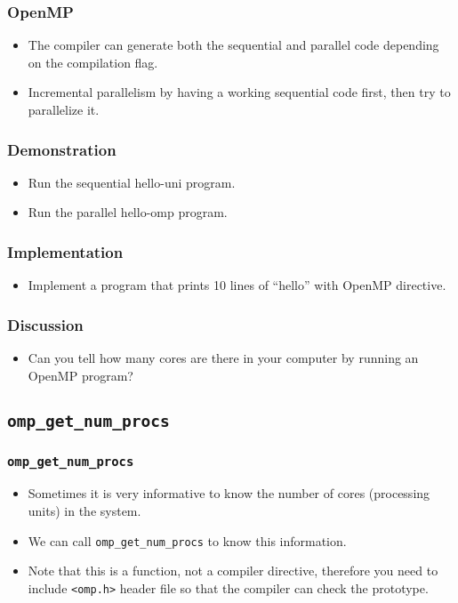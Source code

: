 \documentclass{beamer}
\begin{document}
\begin{frame}
\frametitle{OpenMP} 
\begin{itemize}
\item The compiler can generate both the sequential and parallel
  code depending on the compilation flag.
\item Incremental parallelism by having a working sequential code
  first, then try to parallelize it.
\end{itemize}
\end{frame}

\begin{frame}
\frametitle{Demonstration}
\begin{itemize}
\item Run the sequential hello-uni program.
\item Run the parallel hello-omp program.
\end{itemize}
\end{frame}

\begin{frame}
\frametitle{Implementation}
\begin{itemize}
\item Implement a program that prints 10 lines of ``hello'' with
  OpenMP directive.
\end{itemize}
\end{frame}

\begin{frame}
\frametitle{Discussion}
\begin{itemize}
\item Can you tell how many cores are there in your computer by running
  an OpenMP program?
\end{itemize}
\end{frame}

\subsection{\tt omp\_get\_num\_procs}

\begin{frame}
\frametitle{\tt omp\_get\_num\_procs}
\begin{itemize}
\item Sometimes it is very informative to know the number of cores
  (processing units) in the system.
\item We can call {\tt omp\_get\_num\_procs} to know this information.
\item Note that this is a function, not a compiler directive,
  therefore you need to include {\tt <omp.h>} header file so that the
  compiler can check the prototype.
\end{itemize}
\end{frame}
\end{document}
